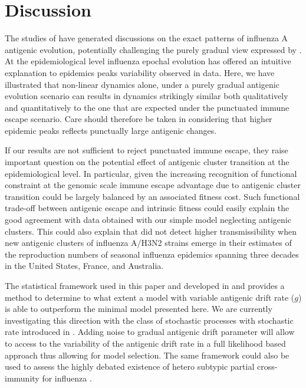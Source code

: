 \documentclass[12pt]{article}
\begin{document}
\section{Discussion}
\label{sec:discussion}

The studies of \citet{Smith2004, Koelle2006, Wolf2006, Shih2007,
  Suzuki2008} have generated discussions on the exact patterns of
influenza A antigenic evolution, potentially challenging the purely
gradual view expressed by \citet{Pease1987}.  At the epidemiological
level influenza epochal evolution has offered an intuitive explanation
to epidemics peaks variability observed in data.  Here, we have
illustrated that non-linear dynamics alone, under a purely gradual
antigenic evolution scenario can results in dynamics strikingly
similar both qualitatively and quantitatively to the one that are
expected under the punctuated immune escape scenario.  Care should
therefore be taken in considering that higher epidemic peaks reflects
punctually large antigenic changes.
%

If our results are not sufficient to reject punctuated immune escape,
they raise important question on the potential effect of antigenic
cluster transition at the epidemiological level. In particular, given
the increasing recognition of functional constraint at the genomic
scale \citep{Rambaut2008, Du2008} immune escape advantage due to
antigenic cluster transition could be largely balanced by an
associated fitness cost. Such functional trade-off between antigenic
escape and intrinsic fitness could easily explain the good agreement
with data obtained with our simple model neglecting antigenic
clusters.  This could also explain that \citet{Chowell2007a} did not
detect higher transmissibility when new antigenic clusters of
influenza A/H3N2 strains emerge in their estimates of the reproduction
numbers of seasonal influenza epidemics spanning three decades in the
United States, France, and Australia.

The statistical framework used in this paper and developed in
\citep{Ionides2006} and \citet{Breto2009} provides a method to
determine to what extent a model with variable antigenic drift rate
($g$) is able to outperform the minimal model presented here. We are
currently investigating this direction with the class of stochastic
processes with stochastic rate introduced in \citet{Breto2009}. Adding
noise to gradual antigenic drift parameter will allow to access to the
variability of the antigenic drift rate in a full likelihood based
approach thus allowing for model selection.  The same framework could
also be used to assess the highly debated existence of hetero subtypic
partial cross-immunity for influenza \citep{Epstein2006}.
\end{document}
